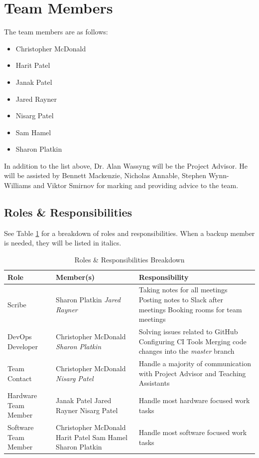 \documentclass[11pt]{article}
\begin{document}
\section{Team Members}
The team members are as follows:
\begin{itemize}
\item Christopher McDonald
\item Harit Patel
\item Janak Patel
\item Jared Rayner
\item Nisarg Patel
\item Sam Hamel
\item Sharon Platkin
\end{itemize}
In addition to the list above, Dr. Alan Wassyng will be the Project Advisor. He will be assisted by Bennett Mackenzie, Nicholas Annable, Stephen Wynn-Williams and Viktor Smirnov for marking and providing advice to the team.
\subsection{Roles \& Responsibilities}
See Table \ref{rr} for a breakdown of roles and responsibilities. When a backup member is needed, they will be listed in italics.
\begin{table}[H] %
\centering
\caption{Roles \& Responsibilities Breakdown} 
\label{rr}
\begin{tabularx}{\textwidth}{| l | p{4cm} | X |}
\hline
Role & Member(s) & Responsibility \\ \hline
Scribe & Sharon Platkin \newline \textit{Jared Rayner} & Taking notes for all meetings \newline Posting notes to Slack after meetings \newline Booking rooms for team meetings  \\ \hline
DevOps Developer & Christopher McDonald \newline \textit{Sharon Platkin} & Solving issues related to GitHub \newline Configuring CI Tools \newline Merging code changes into the \textit{master} branch  \\ \hline
Team Contact & Christopher McDonald \newline \textit{Nisarg Patel} & Handle a majority of communication with Project Advisor and Teaching Assistants \\ \hline
Hardware Team Member & Janak Patel \newline Jared Rayner \newline Nisarg Patel & Handle most hardware focused work tasks \\ \hline
Software Team Member & Christopher McDonald \newline Harit Patel \newline Sam Hamel \newline Sharon Platkin & Handle most software focused work tasks \\ \hline
\end{tabularx}
\end{table}
\end{document}
